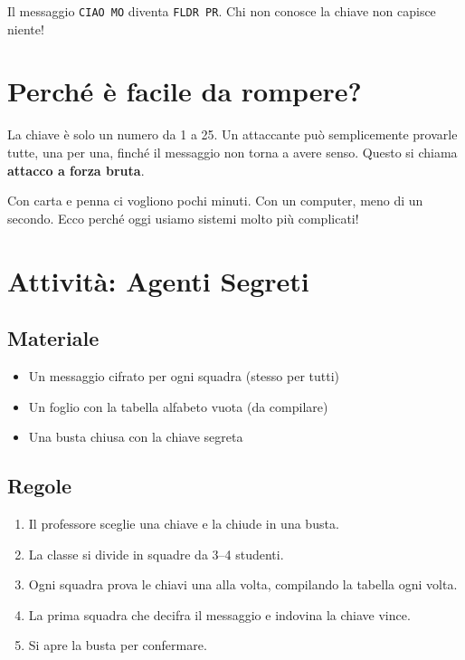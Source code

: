 \documentclass[12pt,a4paper]{article}
\begin{document}
Il messaggio \texttt{CIAO MO} diventa \texttt{FLDR PR}.
Chi non conosce la chiave non capisce niente!

\section{Perché è facile da rompere?}

La chiave è solo un numero da 1 a 25. Un attaccante può
semplicemente provarle tutte, una per una, finché il messaggio
non torna a avere senso. Questo si chiama \textbf{attacco a forza bruta}.

Con carta e penna ci vogliono pochi minuti. Con un computer, meno
di un secondo. Ecco perché oggi usiamo sistemi molto più complicati!

\section{Attività: Agenti Segreti}

\subsection*{Materiale}
\begin{itemize}
  \item Un messaggio cifrato per ogni squadra (stesso per tutti)
  \item Un foglio con la tabella alfabeto vuota (da compilare)
  \item Una busta chiusa con la chiave segreta
\end{itemize}

\subsection*{Regole}
\begin{enumerate}
  \item Il professore sceglie una chiave e la chiude in una busta.
  \item La classe si divide in squadre da 3--4 studenti.
  \item Ogni squadra prova le chiavi una alla volta, compilando
        la tabella ogni volta.
  \item La prima squadra che decifra il messaggio e indovina
        la chiave vince.
  \item Si apre la busta per confermare.
\end{enumerate}
\end{document}
